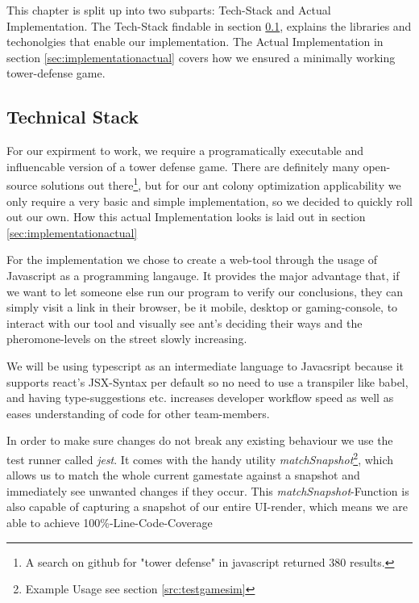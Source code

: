 This chapter is split up into two subparts: Tech-Stack and Actual Implementation. The Tech-Stack findable in section \ref{sec:implementationtech}, explains the libraries and techonolgies that enable our implementation. The Actual Implementation in section \ref{sec:implementationactual} covers how we ensured a minimally working tower-defense game.

\subsection{Technical Stack}
\label{sec:implementationtech}
For our expirment to work, we require a programatically executable and influencable version of a tower defense game. There are definitely many open-source solutions out there\footnote{A search on github for "tower defense" in javascript returned 380 results.\cite{githubtowerdef}}, but for our ant colony optimization applicability we only require a very basic and simple implementation, so we decided to quickly roll out our own. How this actual Implementation looks is laid out in section \ref{sec:implementationactual}

For the implementation we chose to create a web-tool through the usage of Javascript as a programming langauge. It provides the major advantage that, if we want to let someone else run our program to verify our conclusions, they can simply visit a link in their browser, be it mobile, desktop or gaming-console, to interact with our tool and visually see ant's deciding their ways and the pheromone-levels on the street slowly increasing\cite{curran2012future}.

We will be using typescript\cite{libstypescript} as an intermediate language to Javacsript because it supports react's JSX-Syntax per default so no need to use a transpiler like babel, and having type-suggestions etc. increases developer workflow speed as well as eases understanding of code for other team-members.

In order to make sure changes do not break any existing behaviour we use the test runner called \textit{jest}\cite{libsjest}. It comes with the handy utility  \textit{matchSnapshot}\footnote{Example Usage see section \ref{src:testgamesim}}, which allows us to match the whole current gamestate against a snapshot and immediately see unwanted changes if they occur. This \textit{matchSnapshot}-Function is also capable of capturing a snapshot of our entire UI-render, which means we are able to achieve 100\%-Line-Code-Coverage


